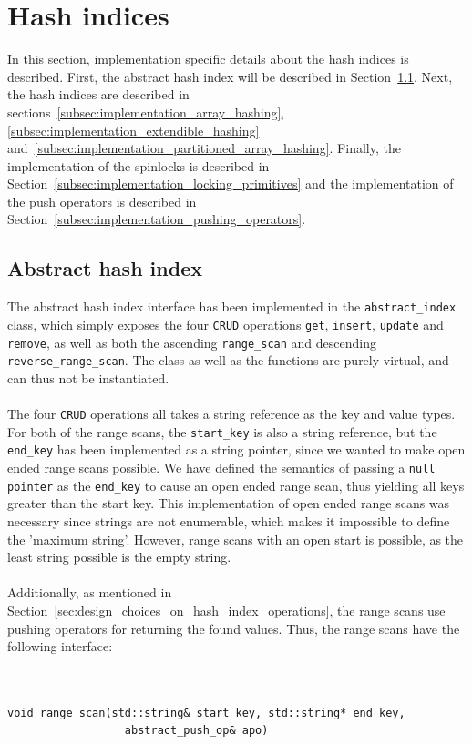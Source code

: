 \documentclass[11pt]{report} %
\begin{document}
\section{Hash indices}
\label{sec:implementation_hashing_indices}
In this section, implementation specific details about the hash indices is described. First, the abstract hash index will be described in Section~\ref{subsec:implementation_abstract_index}. Next, the hash indices are described in sections~\ref{subsec:implementation_array_hashing}, \ref{subsec:implementation_extendible_hashing} and~\ref{subsec:implementation_partitioned_array_hashing}. Finally, the implementation of the spinlocks is described in Section~\ref{subsec:implementation_locking_primitives} and the implementation of the push operators is described in Section~\ref{subsec:implementation_pushing_operators}.
\subsection{Abstract hash index}
\label{subsec:implementation_abstract_index}
The abstract hash index interface has been implemented in the \verb|abstract_index| class, which simply exposes the four \verb|CRUD| operations \verb|get|, \verb|insert|, \verb|update| and \verb|remove|, as well as both the ascending \verb|range_scan| and descending \verb|reverse_range_scan|. The class as well as the functions are purely virtual, and can thus not be instantiated. \\
\\
The four \verb|CRUD| operations all takes a string reference as the key and value types. For both of the range scans, the \verb|start_key| is also a string reference, but the \verb|end_key| has been implemented as a string pointer, since we wanted to make open ended range scans possible. We have defined the semantics of passing a \verb|null pointer| as the \verb|end_key| to cause an open ended range scan, thus yielding all keys greater than the start key. This implementation of open ended range scans was necessary since strings are not enumerable, which makes it impossible to define the 'maximum string'. However, range scans with an open start is possible, as the least string possible is the empty string. \\
\\
Additionally, as mentioned in Section~\ref{sec:design_choices_on_hash_index_operations}, the range scans use pushing operators for returning the found values. Thus, the range scans have the following interface:\\
\\
\begin{fminipage}{\textwidth}
\begin{lstlisting}[]  % Start your code-block

void range_scan(std::string& start_key, std::string* end_key, 
                  abstract_push_op& apo)
\end{lstlisting}
\end{fminipage}
\end{document}
